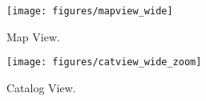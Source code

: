 \begin{figure}[tb]
  \centerline{\texttt{[image: figures/mapview\_wide]}}
  \caption{Map View.}
  \label{fig:mapview}
\end{figure}

\begin{figure}[tb]
  \centerline{\texttt{[image: figures/catview\_wide\_zoom]}}
  \caption{Catalog View.}
  \label{fig:catview}
\end{figure}
